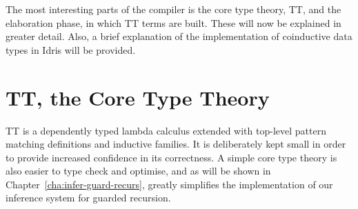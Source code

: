 
The most interesting parts of the compiler is the core type theory, TT, and the
elaboration phase, in which TT terms are built. These will now be explained in
greater detail. Also, a brief explanation of the implementation of coinductive
data types in Idris will be provided.

\section{TT, the Core Type Theory}
\label{sec:tt-core-type}
TT is a dependently typed lambda calculus extended with top-level pattern
matching definitions and inductive families. It is deliberately kept small in order to provide increased
confidence in its correctness. A simple core type theory is also easier to
type check and optimise, and as will be shown in
Chapter~\ref{cha:infer-guard-recurs}, greatly simplifies the implementation of
our inference system for guarded recursion.
